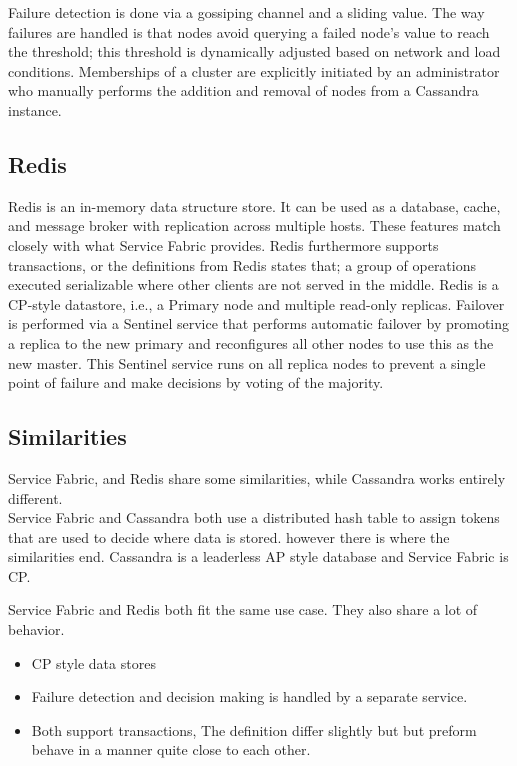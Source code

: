 \documentclass[a4paper,10pt,titlepage]{report}
\begin{document}
Failure detection is done via a gossiping channel and a sliding value. The way failures are handled is that nodes avoid querying a failed node's value to reach the threshold; this threshold is dynamically adjusted based on network and load conditions. Memberships of a cluster are explicitly initiated by an administrator who manually performs the addition and removal of nodes from a Cassandra instance. \cite{Cassandra}
    
    

\subsection{Redis}
Redis is an in-memory data structure store. It can be used as a database, cache, and message broker with replication across multiple hosts. These features match closely with what Service Fabric provides. Redis furthermore supports transactions, or the definitions from Redis states that; a group of operations executed serializable where other clients are not served in the middle. Redis is a CP-style datastore, i.e., a Primary node and multiple read-only replicas. 
Failover is performed via a Sentinel service that performs automatic failover by promoting a replica to the new primary and reconfigures all other nodes to use this as the new master. This Sentinel service runs on all replica nodes to prevent a single point of failure and make decisions by voting of the majority.


\subsection{Similarities}

Service Fabric, and Redis share some similarities, while Cassandra works entirely different. \\ 

Service Fabric and Cassandra both use a distributed hash table to assign tokens that are used to decide where data is stored. however there is where the similarities end. Cassandra is a leaderless AP style database and Service Fabric is CP.

Service Fabric and Redis both fit the same use case. They also share a lot of behavior.
\begin{itemize}
    \item CP style data stores
    \item Failure detection and decision making is handled by a separate service.
    \item Both support transactions, The definition differ slightly but but preform behave in a manner quite close to each other.
\end{itemize}
\end{document}
